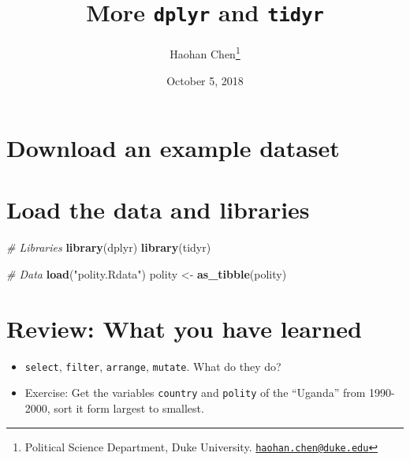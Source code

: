 \documentclass[11pt,]{article}
\title{More \texttt{dplyr} and \texttt{tidyr}}
\author{Haohan Chen\footnote{Political Science Department, Duke University.
  \href{mailto:haohan.chen@duke.edu}{\nolinkurl{haohan.chen@duke.edu}}}}
\date{October 5, 2018}
\newenvironment{Shaded}{\begin{snugshade}}{\end{snugshade}}
\newcommand{\KeywordTok}[1]{\textcolor[rgb]{0.13,0.29,0.53}{\textbf{#1}}}
\newcommand{\StringTok}[1]{\textcolor[rgb]{0.31,0.60,0.02}{#1}}
\newcommand{\CommentTok}[1]{\textcolor[rgb]{0.56,0.35,0.01}{\textit{#1}}}
\newcommand{\NormalTok}[1]{#1}
\providecommand{\tightlist}{%
  \setlength{\itemsep}{0pt}\setlength{\parskip}{0pt}}
\begin{document}
\maketitle

\section{Download an example dataset}\label{download-an-example-dataset}

\begin{Shaded}
\end{Shaded}

\section{Load the data and libraries}\label{load-the-data-and-libraries}

\begin{Shaded}
\begin{Highlighting}[]
\CommentTok{# Libraries}
\KeywordTok{library}\NormalTok{(dplyr)}
\KeywordTok{library}\NormalTok{(tidyr)}

\CommentTok{# Data}
\KeywordTok{load}\NormalTok{(}\StringTok{"polity.Rdata"}\NormalTok{)}
\NormalTok{polity <-}\StringTok{ }\KeywordTok{as_tibble}\NormalTok{(polity)}
\end{Highlighting}
\end{Shaded}

\section{Review: What you have
learned}\label{review-what-you-have-learned}

\begin{itemize}
\tightlist
\item
  \texttt{select}, \texttt{filter}, \texttt{arrange}, \texttt{mutate}.
  What do they do?
\item
  Exercise: Get the variables \texttt{country} and \texttt{polity} of
  the ``Uganda'' from 1990-2000, sort it form largest to smallest.
\end{itemize}
\end{document}
